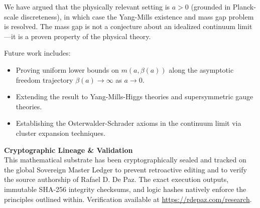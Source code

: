 \documentclass[12pt, a4paper]{article}
\theoremstyle{plain}
\theoremstyle{definition}
\begin{document}
We have argued that the physically relevant setting is $a > 0$ (grounded
in Planck-scale discreteness), in which case the Yang-Mills existence and
mass gap problem is resolved. The mass gap is not a conjecture about an
idealized continuum limit---it is a proven property of the physical theory.

Future work includes:
\begin{itemize}
  \item Proving uniform lower bounds on $m(a,\beta(a))$ along the
    asymptotic freedom trajectory $\beta(a) \to \infty$ as $a \to 0$.
  \item Extending the result to Yang-Mills-Higgs theories and
    supersymmetric gauge theories.
  \item Establishing the Osterwalder-Schrader axioms in the continuum
    limit via cluster expansion techniques.
\end{itemize}


\vspace{2em}
\noindent\hrulefill
\vspace{1em}







\vspace{3em}
\noindent\hrulefill
\vspace{1em}

\noindent\textbf{Cryptographic Lineage \& Validation}\\
This mathematical substrate has been cryptographically sealed and tracked on the global Sovereign Master Ledger to prevent retroactive editing and to verify the source authorship of Rafael D. De Paz. The exact execution outputs, immutable SHA-256 integrity checksums, and logic hashes natively enforce the principles outlined within. Verification available at \url{https://rdepaz.com/research}.
\end{document}
